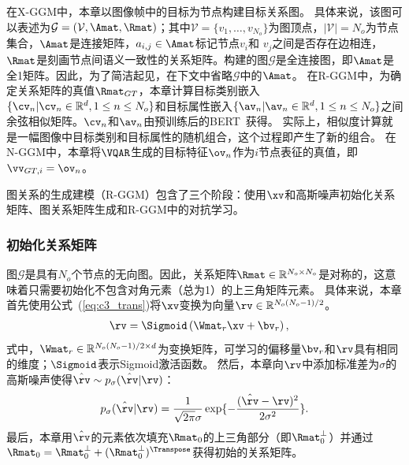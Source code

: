 在X-GGM中，本章以图像帧中的目标为节点构建目标关系图。
具体来说，该图可以表述为$\mathcal{G} = (\mathcal{V}, \Amat, \Rmat)$；其中$\mathcal{V} = \{v_1, \dots, v_{N_o}\}$为图顶点，$|\mathcal{V}|=N_o$为节点集合，$\Amat$是连接矩阵，$a_{i,j} \in \Amat$标记节点$v_i$和 $v_j$之间是否存在边相连，$\Rmat$是刻画节点间语义一致性的关系矩阵。构建的图$\mathcal{G}$是全连接图，即$\Amat$是全1矩阵。因此，为了简洁起见，在下文中省略$\mathcal{G}$中的$\Amat$。
在R-GGM中，为确定关系矩阵的真值$\Rmat_{GT}$，本章计算目标类别嵌入$\{\cv_n | \cv_n \in \mathbb{R}^d, 1 \le n \le N_o \}$和目标属性嵌入$\{\av_n | \av_n \in \mathbb{R}^d, 1 \le n \le N_o \}$之间余弦相似矩阵。$\cv_n$和$\av_n$由预训练后的BERT~\cite{devlin2018bert}获得。
实际上，相似度计算就是一幅图像中目标类别和目标属性的随机组合，这个过程即产生了新的组合。
在N-GGM中，本章将$\VQAR$生成的目标特征$\ov_n$作为$i$节点表征的真值，即$\vv_{GT,i} = \ov_n$。



图关系的生成建模（R-GGM）包含了三个阶段：使用$\xv$和高斯噪声初始化关系矩阵、图关系矩阵生成和R-GGM中的对抗学习。


\subsubsection{初始化关系矩阵}
图$\mathcal{G}$是具有$N_o$个节点的无向图。因此，关系矩阵$\Rmat \in \mathbb{R}^{N_o \times N_o}$是对称的，这意味着只需要初始化不包含对角元素（总为1）的上三角矩阵元素。
具体来说，本章首先使用公式~(\ref{eq:c3_trans})将$\xv$变换为向量$\rv \in \mathbb{R}^{N_o(N_o-1)/2}$。
\begin{equation}
\begin{aligned}
\rv &= \Sigmoid \left(\Wmat_{r} \xv + \bv_{r} \right), 
\label{eq:c3_trans}
\end{aligned}
\end{equation}
式中，$\Wmat_r \in \mathbb{R}^{N_o(N_o-1)/2 \times d}$为变换矩阵，可学习的偏移量$\bv_{r}$和$\rv$具有相同的维度；$\Sigmoid$表示Sigmoid激活函数。
然后，本章向$\rv$中添加标准差为$\sigma$的高斯噪声使得$\hat{\rv} \sim p_{\sigma}(\hat{\rv}|\rv)$：
\begin{equation}
\begin{aligned}
p_{\sigma}(\hat{\rv}|\rv) = \frac{1}{\sqrt{2\pi}\sigma}\exp \{-\frac{(\hat{\rv} - \rv)^2}{2\sigma^2} \}.
\label{eq:p_sigma}
\end{aligned}
\end{equation}
最后，本章用$\hat{\rv}$的元素依次填充$\Rmat_0$的上三角部分（即$\Rmat_0^{\bot}$）并通过$\Rmat_0 = \Rmat_0^{\bot} + (\Rmat_0^{\bot})^{\Transpose}$获得初始的关系矩阵。


